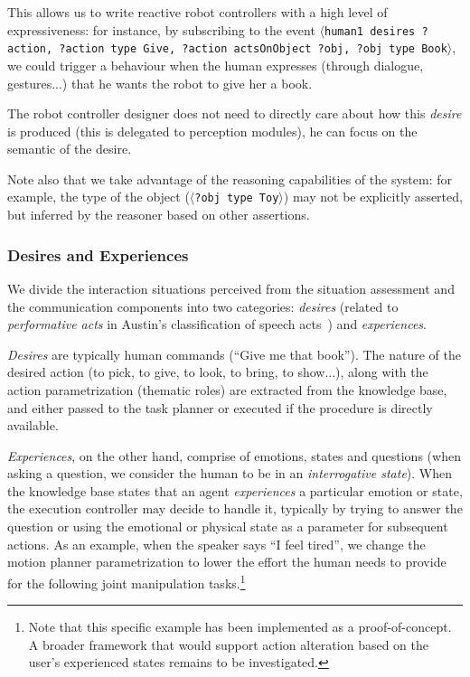 \documentclass[preprint,3p,times]{elsarticle}
\newcommand{\stmt}[1]{{\footnotesize\tt$\langle$#1\relax$\rangle$}}
\begin{document}
This allows us to write reactive robot controllers with a high level of
expressiveness: for instance, by subscribing to the event \stmt{human1 desires
?action, ?action type Give, ?action actsOnObject ?obj, ?obj type Book}, we could
trigger a behaviour when the human expresses (through dialogue, gestures...)
that he wants the robot to give her a book.

The robot controller designer does not need to directly care about how this
\emph{desire} is produced (this is delegated to perception modules), he can
focus on the semantic of the desire.

Note also that we take advantage of the reasoning capabilities of the system:
for example, the type of the object (\stmt{?obj type Toy}) may not be
explicitly asserted, but inferred by the reasoner based on other assertions.

\subsubsection{Desires and Experiences}
\label{sect:desires}

We divide the interaction situations perceived from the situation assessment and
the communication components into two categories: \emph{desires} (related to
\emph{performative acts} in Austin's classification of speech
acts~\cite{Austin1962}) and \emph{experiences}.

\emph{Desires} are typically human commands (``Give me that book''). The nature of
the desired action (to pick, to give, to look, to bring, to show...), along with the action
parametrization (thematic roles) are extracted from the knowledge base, and
either passed to the task planner or executed if the procedure is directly
available.

\emph{Experiences}, on the other hand, comprise of emotions, states and
questions (when asking a question, we consider the human to be in an
\emph{interrogative state}). When the knowledge base states that an agent
\emph{experiences} a particular emotion or state, the execution controller may
decide to handle it, typically by trying to answer the question or using the
emotional or physical state as a parameter for subsequent actions. As an
example, when the speaker says ``I feel tired'', we change the motion planner
parametrization to lower the effort the human needs to provide for the following
joint manipulation tasks.\footnote{Note that this specific example has been
implemented as a proof-of-concept. A broader framework that would support
action alteration based on the user's experienced states remains to be investigated.}
\end{document}
